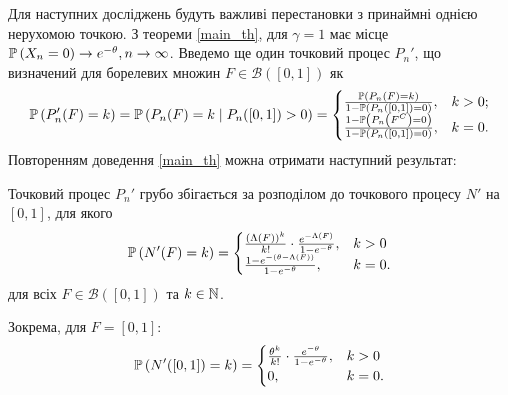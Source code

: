 Для наступних досліджень будуть важливі перестановки з принаймні однією нерухомою точкою.
З теореми \ref{main_th}, для $\gamma = 1$ має місце $\P{X_n = 0} \to e^{-\theta}, n \to \infty$. 
Введемо ще один точковий процес $P_n'$, що визначений для борелевих множин $F \in \mathcal{B}([0, 1])$ як 
\begin{gather}
    \P{P_n' (F) = k} = \P{P_n(F) = k \mid P_n([0, 1]) > 0} = \begin{cases}
        \frac{\P{P_n(F) = k}}{1 - \P{P_n([0, 1]) = 0}}, & k > 0; \\
        \frac{1 - \P{P_n\left(F^C\right) = 0}}{1 - \P{P_n([0, 1]) = 0}}, & k = 0.
    \end{cases} 
\end{gather}
Повторенням доведення \ref{main_th} можна отримати наступний результат:
\begin{theorem}\label{cond_th}
    Точковий процес $P_n'$ грубо збігається за розподілом до точкового процесу $N'$ на $[0, 1]$, 
    для якого
    \begin{gather}
        \P{N' (F) = k} =
        \begin{cases}
            \frac{(\Lambda(F))^k}{k!} \cdot \frac{e^{-\Lambda(F)}}{1 - e^{-\theta}}, & k > 0 \\
            \frac{1 - e^{-\left(\theta - \Lambda(F)\right)}}{1 - e^{-\theta}}, & k = 0.
        \end{cases}
    \end{gather}
    для всіх $F \in \mathcal{B}([0, 1])$ та $k \in \N$.
\end{theorem}
Зокрема, для $F = [0, 1]$:
\begin{gather}
    \P{N' ([0, 1]) = k} = 
    \begin{cases}
        \frac{\theta^k}{k!} \cdot \frac{e^{-\theta}}{1 - e^{-\theta}}, & k > 0 \\
        0, & k = 0.
    \end{cases}
\end{gather}

